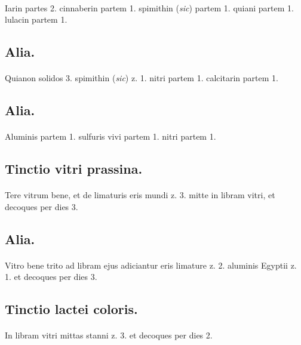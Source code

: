 \documentclass[a4paper, 11pt, oneside, polutonikogreek, italian]{article}
\begin{document}
\paragraph{}
Iarin partes 2. cinnaberin partem 1. spimithin (\emph{sic}) partem 1. quiani partem 1. lulacin partem 1.

\subsection{Alia.}
\paragraph{}
Quianon solidos 3. spimithin (\emph{sic}) z. 1. nitri partem 1. calcitarin partem 1.

\subsection{Alia.}
\paragraph{}
Aluminis partem 1. sulfuris vivi partem 1. nitri partem 1.

\subsection{Tinctio vitri prassina.}
\paragraph{}
Tere vitrum bene, et de limaturis eris mundi z. 3. mitte in libram vitri, et decoques per dies 3.

\subsection{Alia.}
\paragraph{}
Vitro bene trito ad libram ejus adiciantur eris limature z. 2. aluminis Egyptii z. 1. et decoques per dies 3.

\subsection{Tinctio lactei coloris.}
\paragraph{}
In libram vitri mittas stanni z. 3. et decoques per dies 2.
\end{document}
